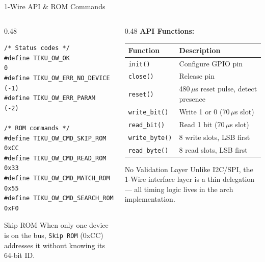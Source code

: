 \documentclass[aspectratio=169, 10pt]{beamer}
\begin{document}
\begin{frame}[fragile]{1-Wire API \& ROM Commands}
\begin{columns}[T]
\begin{column}{0.48\textwidth}
\begin{lstlisting}[style=cstyle,
  title={interfaces/onewire/tiku\_onewire.h}]
/* Status codes */
#define TIKU_OW_OK              0
#define TIKU_OW_ERR_NO_DEVICE (-1)
#define TIKU_OW_ERR_PARAM     (-2)

/* ROM commands */
#define TIKU_OW_CMD_SKIP_ROM   0xCC
#define TIKU_OW_CMD_READ_ROM   0x33
#define TIKU_OW_CMD_MATCH_ROM  0x55
#define TIKU_OW_CMD_SEARCH_ROM 0xF0
\end{lstlisting}

\vspace{0.3em}
\begin{block}{Skip ROM}
When only one device is on the bus,
\texttt{Skip ROM} (0xCC) addresses it
without knowing its 64-bit ID.
\end{block}
\end{column}

\begin{column}{0.48\textwidth}
\textbf{API Functions:}
\begin{table}
\centering
\scriptsize
\begin{tabular}{@{}lp{4cm}@{}}
\toprule
\textbf{Function} & \textbf{Description} \\
\midrule
\texttt{init()}         & Configure GPIO pin \\
\texttt{close()}        & Release pin \\
\texttt{reset()}        & 480\,$\mu$s reset pulse, detect presence \\
\texttt{write\_bit()}   & Write 1 or 0 (70\,$\mu$s slot) \\
\texttt{read\_bit()}    & Read 1 bit (70\,$\mu$s slot) \\
\texttt{write\_byte()}  & 8 write slots, LSB first \\
\texttt{read\_byte()}   & 8 read slots, LSB first \\
\bottomrule
\end{tabular}
\end{table}

\vspace{0.3em}
\begin{alertblock}{No Validation Layer}
Unlike I2C/SPI, the 1-Wire interface layer
is a thin delegation --- all timing logic
lives in the arch implementation.
\end{alertblock}
\end{column}
\end{columns}
\end{frame}
\end{document}
